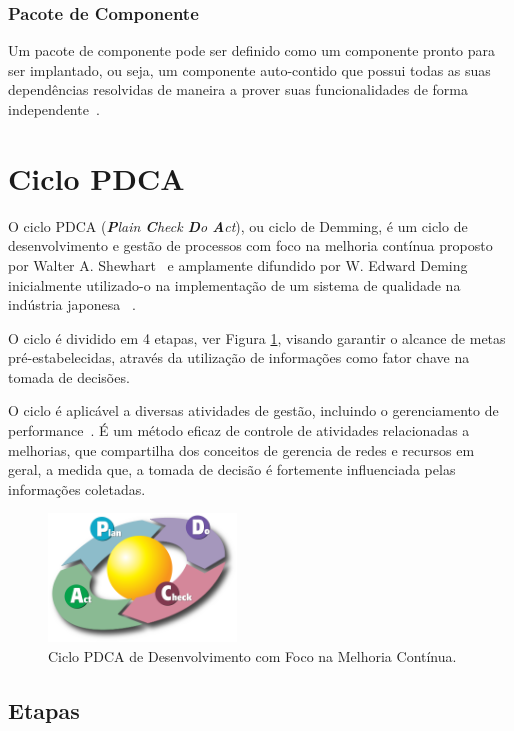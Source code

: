 \subsubsection{Pacote de Componente}
Um pacote de componente pode ser definido como um componente pronto para ser implantado, ou seja, um componente auto-contido que possui todas as suas dependências resolvidas de maneira a prover suas funcionalidades de forma independente~\cite{cervantes2005techical}.

\section{Ciclo PDCA}
\label{sec:pdca}
O ciclo PDCA (\textit{\textbf{P}lain \textbf{C}heck \textbf{D}o \textbf{A}ct}), ou ciclo de  Demming, é um ciclo de desenvolvimento e gestão de processos com foco na melhoria contínua proposto por Walter A. Shewhart~\cite{shewhart} e amplamente difundido por W. Edward Deming~\cite{deming} inicialmente utilizado-o na implementação de um sistema de qualidade na indústria japonesa ~\cite{fabio2003}.

O ciclo é dividido em 4 etapas, ver Figura \ref{fig:pdca}, visando garantir o alcance de metas pré-estabelecidas, através da utilização de informações como fator chave na tomada de decisões.

O ciclo é aplicável a diversas atividades de gestão, incluindo o gerenciamento de performance~\cite{pdcapm}. É um método eficaz de controle de atividades relacionadas a melhorias, que compartilha dos conceitos de gerencia de redes e recursos em geral, a medida que, a tomada de decisão é fortemente influenciada pelas informações coletadas.


\begin{figure}[htp]
\centering
\includegraphics[width=5cm]{chapters/chapter2/pdca_cycle.png}
\caption[Ciclo PDCA]{Ciclo PDCA de Desenvolvimento com Foco na Melhoria Contínua.}
\label{fig:pdca}
\end{figure}


\subsection{Etapas}
\label{pdca:phases}
